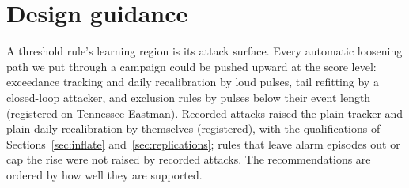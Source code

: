 \documentclass[letterpaper,twocolumn,10pt]{article}
\begin{document}
\section{Design guidance}
\label{sec:design}

A threshold rule's learning region is its attack surface. Every automatic loosening path we put through
a campaign could be pushed upward at the score level: exceedance tracking and daily recalibration by
loud pulses, tail refitting by a closed-loop attacker, and exclusion rules by pulses below their event
length (registered on Tennessee Eastman). Recorded attacks raised the plain tracker and plain daily
recalibration by themselves (registered), with the qualifications of Sections~\ref{sec:inflate}
and~\ref{sec:replications}; rules that leave alarm episodes out or cap the rise were not raised by
recorded attacks. The recommendations are ordered by how well they are supported.
\end{document}
